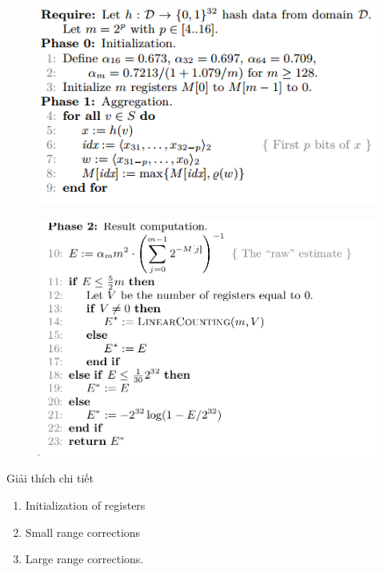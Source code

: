 \documentclass{beamer}
\begin{document}
\begin{frame}
\begin{figure}[H]
\includegraphics[scale=0.6]{HLL1.png}

\end{figure}
\end{frame}
\begin{frame}
\begin{figure}[H]
\includegraphics[scale=0.3]{HLL2.png}
\end{figure}
\end{frame}

\begin{frame}{Giải thích chi tiết}
\begin{enumerate}
\item Initialization of registers
\item Small range corrections
\item Large range corrections.
\end{enumerate}
\end{frame}
\end{document}
